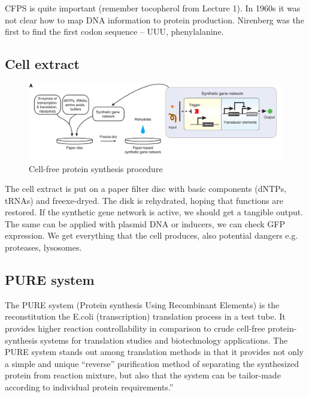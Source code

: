 \noindent
CFPS is quite important (remember tocopherol from Lecture 1). In 1960s it was not clear how to map DNA information to protein production. Nirenberg was the first to find the first codon sequence – UUU, phenylalanine. 

\subsection{Cell extract}
\begin{figure}[h]
\includegraphics[width=1\textwidth]{cfps}
\caption{\label{fig:cfps} Cell-free protein synthesis procedure}
\end{figure}

\noindent
The cell extract is put on a paper filter disc with basic components (dNTPs, tRNAs) and freexe-dryed. The disk is rehydrated, hoping that functions are restored. If the synthetic gene network is active, we should get a tangible output. The same can be applied with plasmid DNA or inducers, we can check GFP expression. We get everything that the cell produces, also potential dangers e.g. proteases, lysosomes.

\subsection{PURE system}
The PURE system (Protein synthesis Using Recombinant Elements) is the reconstitution the E.coli (transcription) translation process in a test tube. It provides higher reaction controllability in comparison to crude cell-free protein- synthesis systems for translation studies and biotechnology applications. 
The PURE system stands out among translation methods in that it provides not only a simple and unique “reverse” purification method of separating the synthesized protein from reaction mixture, but also that the system can be tailor-made according to individual protein requirements.” 

